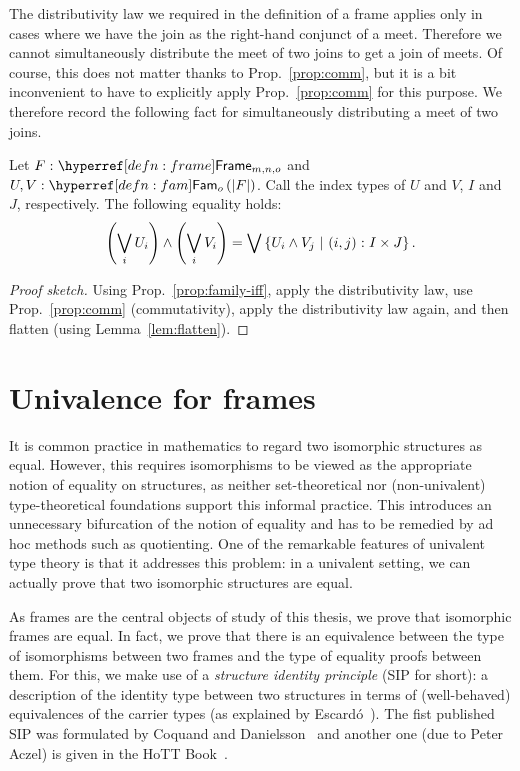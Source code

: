 The distributivity law we required in the definition of a frame applies only in cases
where we have the join as the right-hand conjunct of a meet. Therefore we cannot
simultaneously distribute the meet of two joins to get a join of meets. Of course, this
does not matter thanks to Prop.~\ref{prop:comm}, but it is a bit inconvenient to have to
explicitly apply Prop.~\ref{prop:comm} for this purpose. We therefore record the following
fact for simultaneously distributing a meet of two joins.

\begin{prop}\label{prop:distr}
  Let $\oftyI{F}{\framety{m}{n}{o}}$ and $\oftyII{U}{V}{\sub{o}{\abs{F}}}$. Call the index
  types of $U$ and $V$, $I$ and $J$, respectively. The following equality holds:
  \begin{equation*}
      \left( \bigvee_i U_i \right) \wedge \left( \bigvee_i V_i \right)
    = \bigvee \left\{  U_i \wedge V_j ~|~ (i, j)\hspace{0.1mm}:\hspace{0.1mm}I \times J  \right\}.
  \end{equation*}
\end{prop}
\begin{proof}[Proof sketch]
  Using Prop.~\ref{prop:family-iff}, apply the distributivity law, use
  Prop.~\ref{prop:comm} (commutativity), apply the distributivity law again, and then
  flatten (using Lemma~\ref{lem:flatten}).
\end{proof}

\section{Univalence for frames}\label{sec:frame-univ}

It is common practice in mathematics to regard two isomorphic structures as equal.
However, this requires isomorphisms to be viewed as the appropriate notion of equality on
structures, as neither set-theoretical nor (non-univalent) type-theoretical foundations
support this informal practice. This introduces an unnecessary bifurcation of the notion
of equality and has to be remedied by ad hoc methods such as quotienting. One of the
remarkable features of univalent type theory is that it addresses this problem: in a
univalent setting, we can actually prove that two isomorphic structures are equal.

As frames are the central objects of study of this thesis, we prove that isomorphic frames
are equal. In fact, we prove that there is an equivalence between the type of isomorphisms
between two frames and the type of equality proofs between them. For this, we make use of
a \emph{structure identity principle} (SIP for short): a description of the identity type
between two structures in terms of (well-behaved) equivalences of the carrier types (as
explained by Escardó~\cite{escardo-uf-intro}). The fist published SIP was formulated by
Coquand and Danielsson~\cite{coq-nad} and another one (due to Peter Aczel) is given in the
HoTT Book~\cite{hottbook}.

